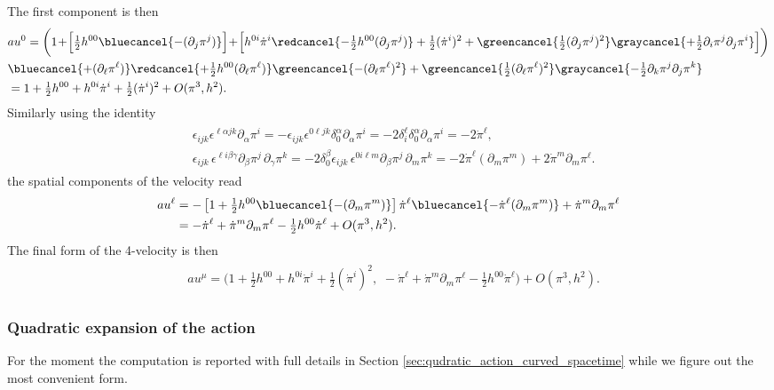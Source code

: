The first component is then
{\small\begin{align}
\begin{aligned}
    &au^0=\bigg(1 \!+\! \Big[\tfrac12 h^{00} \bluecancel{-(\partial_j \pi^j)}\Big]\! +\! \Big[ h^{0 i} \dot{\pi}^i \redcancel{-\tfrac12 h^{00} (\partial_j \pi^j)} + \tfrac12 (\dot{\pi}^i)^2 + \greencancel{\tfrac12 (\partial_j \pi^j)^2}\graycancel{+\tfrac12 \partial_i\pi^j\partial_j\pi^i}\Big]\bigg) 
    \\
    &\bluecancel{+(\partial_\ell\pi^\ell)} \redcancel{+\tfrac12 h^{00} (\partial_\ell\pi^\ell)}\greencancel{-(\partial_\ell\pi^\ell)^2} + \greencancel{\tfrac12 (\partial_\ell\pi^\ell)^2} \graycancel{-\tfrac12 \partial_k\pi^j\partial_j\pi^k}
    \\
    &=1 + \tfrac12 h^{00} +h^{0i}\dot{\pi}^i+ \tfrac12 (\dot{\pi}^i)^2 + O(\pi^3, h^2).
\end{aligned}\end{align}}
Similarly using the identity
{\small\begin{align}\begin{aligned}
    &\epsilon_{ijk}\epsilon^{\ell\alpha jk}\partial_\alpha\pi^i= - \epsilon_{ijk}\epsilon^{0\ell jk}\delta^\alpha_0\partial_\alpha\pi^i = -2 \delta_i^\ell\delta^\alpha_0\partial_\alpha\pi^i = -2 \dot{\pi}^\ell,\\[2pt]
    & \epsilon_{ijk}\, \epsilon^{\ell i \beta\gamma}\partial_\beta\pi^j\,\partial_\gamma\pi^k= -2\delta^\beta_0 \epsilon_{ijk}\, \epsilon^{0 i \ell m} \partial_\beta\pi^j\,\partial_m\pi^k = -2 \dot{\pi}^\ell (\partial_m\pi^m) + 2 \dot{\pi}^m \partial_m\pi^\ell.
\end{aligned}
\end{align}}
the spatial components of the velocity read
{\small\begin{align}
    au^\ell &= -\left[1 + \tfrac12 h^{00}\bluecancel{-(\partial_m\pi^m)}\right]\dot{\pi}^\ell  \bluecancel{- \dot{\pi}^\ell (\partial_m\pi^m)} + \dot{\pi}^m \partial_m\pi^\ell\\
    &= - \dot{\pi}^\ell + \dot{\pi}^m \partial_m\pi^\ell - \tfrac12 h^{00}\dot{\pi}^\ell + O(\pi^3, h^2).
\end{align}}
The final form of the 4-velocity is then 
{\small\begin{align}
\begin{aligned}
    &au^\mu=\Big(1 + \tfrac12 h^{00} +h^{0i}\dot{\pi}^i+ \tfrac12 (\dot{\pi}^i)^2,\,\,- \dot{\pi}^\ell + \dot{\pi}^m \partial_m\pi^\ell - \tfrac12 h^{00}\dot{\pi}^\ell\Big)+ O(\pi^3, h^2).
\end{aligned}\end{align}}



\subsubsection{Quadratic expansion of the action}
For the moment the computation is reported with full details in Section \ref{sec:qudratic_action_curved_spacetime} while we figure out the most convenient form.